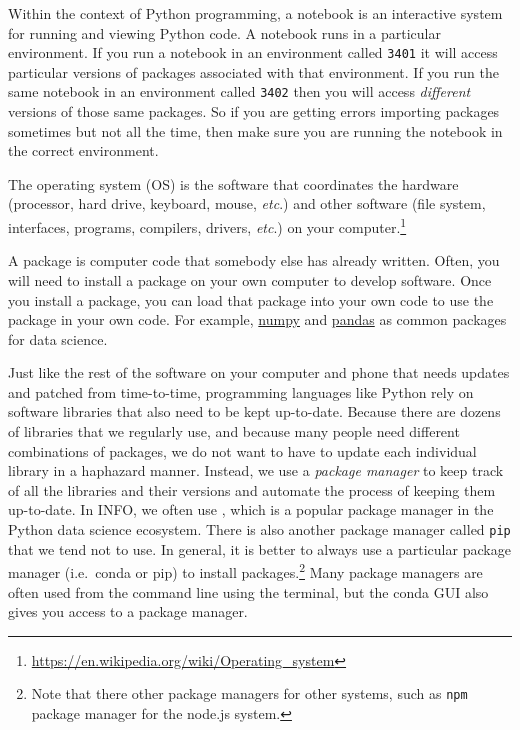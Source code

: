 \begin{description}[noitemsep]
    \item[Notebook.] Within the context of Python programming, a notebook is an interactive system for running and viewing Python code. A notebook runs in a particular environment. If you run a notebook in an environment called \texttt{3401} it will access particular versions of packages associated with that environment. If you run the same notebook in an environment called \texttt{3402} then you will access \textit{different} versions of those same packages. So if you are getting errors importing packages sometimes but not all the time, then make sure you are running the notebook in the correct environment.
    \item[Operating system.] The operating system (OS) is the software that coordinates the hardware (processor, hard drive, keyboard, mouse, \textit{etc}.) and other software (file system, interfaces, programs, compilers, drivers, \textit{etc}.) on your computer.\footnote{\url{https://en.wikipedia.org/wiki/Operating_system}}
    \item[Package.] A package is computer code that somebody else has already written. Often, you will need to install a package on your own computer to develop software. Once you install a package, you can load that package into your own code to use the package in your own code. For example, \href{https://numpy.org/}{numpy} and \href{https://pandas.pydata.org/}{pandas} as common packages for data science.
    \item[Package manager.]
    Just like the rest of the software on your computer and phone that needs updates and patched from time-to-time, programming languages like Python rely on software libraries that also need to be kept up-to-date. Because there are dozens of libraries that we regularly use, and because many people need different combinations of packages, we do not want to have to update each individual library in a haphazard manner. Instead, we use a \textit{package manager} to keep track of all the libraries and their versions and automate the process of keeping them up-to-date. In INFO, we often use \conda, which is a popular package manager in the Python data science ecosystem. There is also another package manager called \texttt{pip} that we tend not to use. In general, it is better to always use a particular package manager (i.e.\ conda or pip) to install packages.\footnote{Note that there other package managers for other systems, such as \texttt{npm} package manager for the node.js system.}
    Many package managers are often used from the command line using the terminal, but the conda GUI also gives you access to a package manager. 

\end{description}
